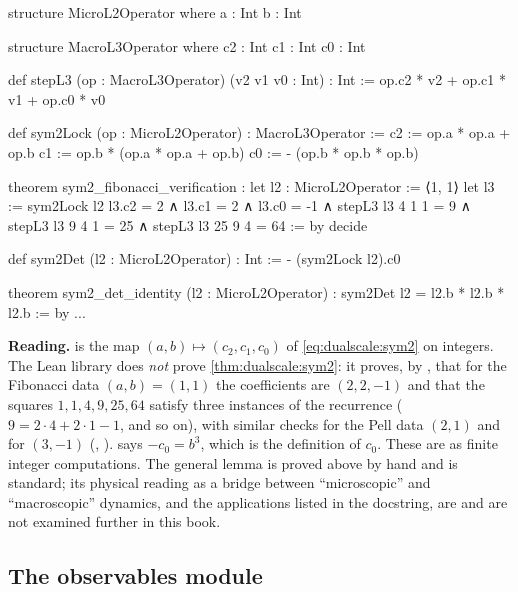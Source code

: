 \begin{leanbox}
\begin{leancode}
structure MicroL2Operator where
  a : Int
  b : Int

structure MacroL3Operator where
  c2 : Int
  c1 : Int
  c0 : Int

def stepL3 (op : MacroL3Operator) (v2 v1 v0 : Int) : Int :=
  op.c2 * v2 + op.c1 * v1 + op.c0 * v0

def sym2Lock (op : MicroL2Operator) : MacroL3Operator := {
  c2 := op.a * op.a + op.b
  c1 := op.b * (op.a * op.a + op.b)
  c0 := - (op.b * op.b * op.b) }

theorem sym2_fibonacci_verification :
    let l2 : MicroL2Operator := ⟨1, 1⟩
    let l3 := sym2Lock l2
    l3.c2 = 2 ∧ l3.c1 = 2 ∧ l3.c0 = -1 ∧
    stepL3 l3 4 1 1 = 9 ∧ stepL3 l3 9 4 1 = 25 ∧ stepL3 l3 25 9 4 = 64 := by
  decide

def sym2Det (l2 : MicroL2Operator) : Int := - (sym2Lock l2).c0

theorem sym2_det_identity (l2 : MicroL2Operator) :
    sym2Det l2 = l2.b * l2.b * l2.b := by ...
\end{leancode}
\textbf{Reading.}  is the map $(a,b)\mapsto(c_2,c_1,c_0)$ of
\eqref{eq:dualscale:sym2} on integers. The Lean library does \emph{not} prove
\cref{thm:dualscale:sym2}: it proves, by , that for the Fibonacci data
$(a,b)=(1,1)$ the coefficients are $(2,2,-1)$ and that the squares $1,1,4,9,25,64$ satisfy
three instances of the recurrence ($9=2\cdot4+2\cdot1-1$, and so on), with similar checks for
the Pell data $(2,1)$ and for $(3,-1)$ (,
).  says $-c_0=b^3$,
which is the definition of $c_0$. These are \TA{} as finite integer computations. The general
lemma is proved above by hand and is standard; its physical reading as a bridge between
``microscopic'' and ``macroscopic'' dynamics, and the applications listed in the docstring, are
\TC{} and are not examined further in this book.
\end{leanbox}

\subsection{The observables module}

